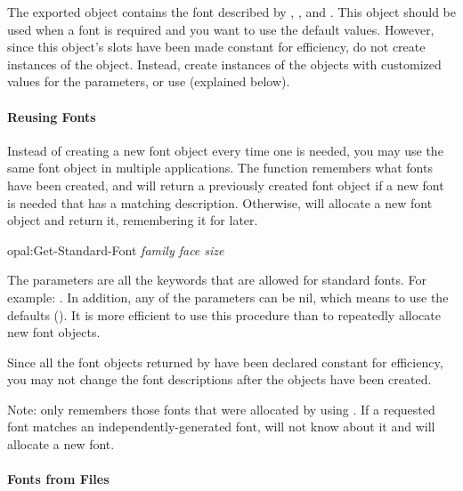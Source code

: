 The exported  object contains the font described by
, , and .  This object should be
used when a font is required and you want to use the default values.
However, since this object's slots have been made constant for efficiency,
do not create instances of the  object.
Instead, create instances of the  objects with customized
values for the parameters, or use  (explained below).


\paragraph{Reusing Fonts}
Instead of creating a new font object every time one is needed, you may
use the same font object in multiple applications.  The function
 remembers what fonts have been created, and will
return a previously created font object if a new font is needed that has
a matching description.  Otherwise,  will allocate a
new font object and return it, remembering it for later.

\vspace{1 line}
\begin{programexample}
opal:Get-Standard-Font {\it family face size}\value{function}
\end{programexample}
The parameters are all the keywords that are allowed for standard fonts.
For example: .  In
addition, any of the parameters can be {\sc nil}, which means to use the
defaults ().  It is more efficient to use
this procedure than to repeatedly allocate new font objects.

Since all the font objects returned by  have
been declared constant for efficiency, you may not change the font
descriptions after the objects have been created.

Note:   only remembers those fonts that were allocated
by using .  If a requested font matches an
independently-generated font,  will not know about it
and will allocate a new font.



\paragraph{Fonts from Files}


